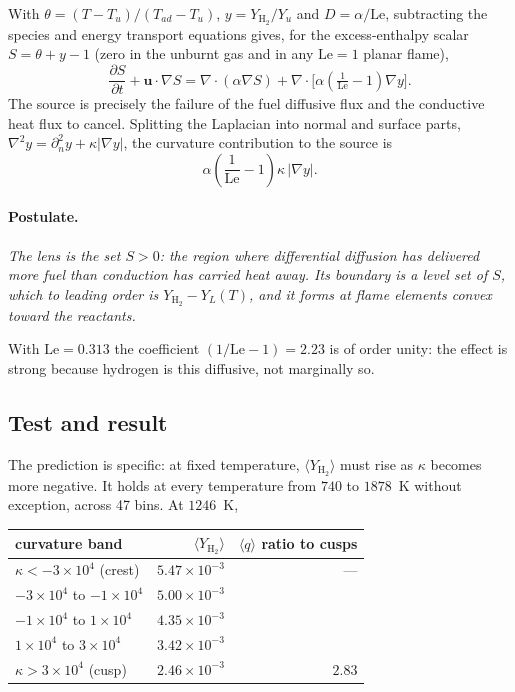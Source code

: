 \documentclass[11pt]{article}
\newcommand{\YH}{Y_{\mathrm{H_2}}}
\newcommand{\Le}{\mathrm{Le}}
\newcommand{\grad}{\nabla}
\newcommand{\pd}[2]{\frac{\partial #1}{\partial #2}}
\begin{document}
With $\theta = (T-T_u)/(T_{ad}-T_u)$, $y = \YH/Y_u$ and $D = \alpha/\Le$,
subtracting the species and energy transport equations gives, for the
excess-enthalpy scalar $S = \theta + y - 1$ (zero in the unburnt gas and in
any $\Le=1$ planar flame),
\begin{equation}
  \pd{S}{t} + \mathbf{u}\cdot\grad S
    = \grad\!\cdot(\alpha \grad S)
    + \grad\!\cdot\!\big[\alpha(\tfrac{1}{\Le}-1)\grad y\big].
  \label{eq:S}
\end{equation}
The source is precisely the failure of the fuel diffusive flux and the
conductive heat flux to cancel. Splitting the Laplacian into normal and
surface parts, $\grad^2 y = \partial^2_n y + \kappa|\grad y|$, the curvature
contribution to the source is
\begin{equation}
  \alpha\left(\frac{1}{\Le}-1\right)\kappa\,|\grad y|.
  \label{eq:source}
\end{equation}

\paragraph{Postulate.} \emph{The lens is the set $S > 0$: the region where
differential diffusion has delivered more fuel than conduction has carried
heat away. Its boundary is a level set of $S$, which to leading order is
$\YH - Y_L(T)$, and it forms at flame elements convex toward the reactants.}

With $\Le = 0.313$ the coefficient $(1/\Le - 1) = 2.23$ is of order unity: the
effect is strong because hydrogen is this diffusive, not marginally so.

\subsection{Test and result}
\label{sec:postulate-test}

The prediction is specific: at fixed temperature, $\langle \YH \rangle$ must
rise as $\kappa$ becomes more negative. It holds at every temperature from
$740$ to $1878$~K without exception, across 47 bins. At $1246$~K,

\begin{center}
\begin{tabular}{lrr}
\toprule
curvature band & $\langle \YH \rangle$ & $\langle q \rangle$ ratio to cusps \\
\midrule
$\kappa < -3\times10^{4}$ (crest) & $5.47\times10^{-3}$ & --- \\
$-3\times10^{4}$ to $-1\times10^{4}$ & $5.00\times10^{-3}$ & \\
$-1\times10^{4}$ to $1\times10^{4}$ & $4.35\times10^{-3}$ & \\
$1\times10^{4}$ to $3\times10^{4}$ & $3.42\times10^{-3}$ & \\
$\kappa > 3\times10^{4}$ (cusp) & $2.46\times10^{-3}$ & $2.83$ \\
\bottomrule
\end{tabular}
\end{center}
\end{document}
